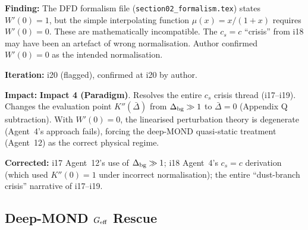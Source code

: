 \documentclass[11pt,a4paper]{article}
\newcommand{\impfour}{\textcolor{impact4}{\textbf{Impact 4 (Paradigm)}}}
\begin{document}
\begin{tcolorbox}[colback=red!5!white, colframe=red!70!black,
  title=\textbf{$W'(0) = 0$ --- Iteration 20}]

\textbf{Finding:} The DFD formalism file (\texttt{section02\_formalism.tex})
states $W'(0) = 1$, but the simple interpolating function
$\mu(x) = x/(1+x)$ requires $W'(0) = 0$. These are mathematically
incompatible. The $c_s = c$ ``crisis'' from i18 may have been an artefact
of wrong normalisation. Author confirmed $W'(0) = 0$ as the intended
normalisation.

\textbf{Iteration:} i20 (flagged), confirmed at i20 by author.

\textbf{Impact:} \impfour. Resolves the entire $c_s$ crisis thread
(i17--i19). Changes the evaluation point $K''(\bar\Delta)$ from
$\Delta_{\rm bg} \gg 1$ to $\bar\Delta = 0$ (Appendix Q subtraction).
With $W'(0) = 0$, the linearised perturbation theory is degenerate
(Agent~4's approach fails), forcing the deep-MOND quasi-static treatment
(Agent~12) as the correct physical regime.

\textbf{Corrected:} i17 Agent~12's use of $\Delta_{\rm bg} \gg 1$;
i18 Agent~4's $c_s = c$ derivation (which used $K''(0) = 1$ under
incorrect normalisation); the entire ``dust-branch crisis'' narrative
of i17--i19.

\end{tcolorbox}

\subsection{Deep-MOND $G_{\rm eff}$ Rescue}
\label{sec:deep-mond}
\end{document}
